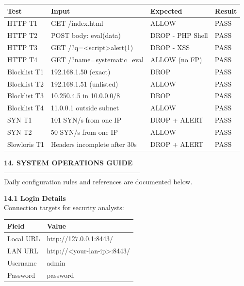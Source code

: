 \documentclass[12pt,a4paper]{article}
\newcommand{\thfmt}[1]{\textbf{#1}}
\begin{document}
\begin{center}
\begin{tabular}{L{2.8cm} L{5.4cm} L{3.8cm} C{2.4cm}}
\hline
\thfmt{Test} & \thfmt{Input} & \thfmt{Expected} & \thfmt{Result} \\
\hline
HTTP T1      & GET /index.html              & ALLOW            & PASS \\
HTTP T2      & POST body: eval(data)         & DROP - PHP Shell & PASS \\
HTTP T3      & GET /?q=<script>alert(1)      & DROP - XSS       & PASS \\
HTTP T4      & GET /?name=\allowbreak systematic\_\allowbreak eval   & ALLOW (no FP)    & PASS \\
Blocklist T1 & 192.168.1.50 (exact)          & DROP             & PASS \\
Blocklist T2 & 192.168.1.51 (unlisted)       & ALLOW            & PASS \\
Blocklist T3 & 10.250.4.5 in 10.0.0.0/8      & DROP             & PASS \\
Blocklist T4 & 11.0.0.1 outside subnet       & ALLOW            & PASS \\
SYN T1       & 101 SYN/s from one IP         & DROP + ALERT     & PASS \\
SYN T2       & 50 SYN/s from one IP          & ALLOW            & PASS \\
Slowloris T1 & Headers incomplete after 30s  & DROP + ALERT     & PASS \\
\hline
\end{tabular}
\end{center}

\vspace{1.5em}
\textbf{14. SYSTEM OPERATIONS GUIDE}\\
------------------------------------------------------------\\
Daily configuration rules and references are documented below.

\textbf{14.1 Login Details}\\
Connection targets for security analysts:

\begin{center}
\begin{tabular}{L{4cm} L{10.5cm}}
\hline
\thfmt{Field} & \thfmt{Value} \\
\hline
Local URL  & http://127.0.0.1:8443/ \\
LAN URL    & http://<your-lan-ip>:8443/ \\
Username   & admin \\
Password   & password \\
\hline
\end{tabular}
\end{center}
\end{document}
